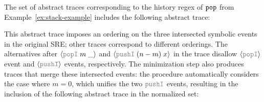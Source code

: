 \begin{example}\label{ex:sre-norm}
  The set of abstract traces corresponding to the history regex of
  $\boldsymbol{{\tt pop}}$ from Example~\ref{ex:stack-example} includes the
  following abstract trace: %
  \vspace{-.4cm} \par{}\noindent
  This abstract trace imposes an ordering on the three intersected
  symbolic events in the original SRE; other traces correspond to
  different orderings. The alternatives after
  $\msgAGray{popI}{m\;\_}$ and $\msgAGray{pushI}{(n-m)\;x}$ in the
  trace disallow $\msgCGray{popI}$ event and
  $\msgCGray{pushI}$ events, respectively. The minimization step
  also produces traces that merge these intersected events: the
  procedure automatically considers the case where $m = 0$, which
  unifies the two $\effGray{pushI}$ events, resulting in the inclusion
  of the following abstract trace in the normalized set: %
  \vspace{-.4cm} \par{}\noindent
\end{example}

